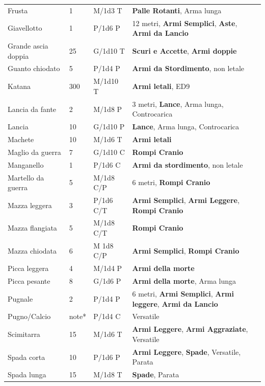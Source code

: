 \begin{xltabular}{1\textwidth}{lllX}
Frusta& 1& M/1d3 T& \textbf{Palle Rotanti}, Arma lunga\\
Giavellotto& 1& P/1d6 P& 12 metri, \textbf{Armi Semplici}, \textbf{Aste}, \textbf{Armi da Lancio}\\
Grande ascia doppia& 25 & G/1d10 T& \textbf{Scuri e Accette}, \textbf{Armi doppie}\\
Guanto chiodato& 5& P/1d4 P&\textbf{Armi da Stordimento}, non letale\\
Katana& 300& M/1d10 T& \textbf{Armi letali}, ED9\\
Lancia da fante& 2& M/1d8 P&3 metri, \textbf{Lance}, Arma lunga, Controcarica\\
Lancia& 10 & G/1d10 P&\textbf{Lance}, Arma lunga, Controcarica\\
Machete& 10 & M/1d6 T&\textbf{Armi letali}\\
Maglio da guerra& 7& G/1d10 C& \textbf{Rompi Cranio}\\
Manganello& 1& P/1d6 C& \textbf{Armi da stordimento}, non letale\\
Martello da guerra& 5& M/1d8 C/P& 6 metri, \textbf{Rompi Cranio}\\
Mazza leggera& 3& P/1d6 C/T& \textbf{Armi Semplici}, \textbf{Armi Leggere}, \textbf{Rompi Cranio} \\
Mazza flangiata& 5& M/1d8 C/T& \textbf{Rompi Cranio}\\
Mazza chiodata& 6& M 1d8 C/P& \textbf{Armi Semplici}, \textbf{Rompi Cranio}\\
Picca leggera& 4& M/1d4 P&\textbf{Armi della morte}\\
Picca pesante& 8& G/1d6 P&\textbf{Armi della morte}, Arma lunga\\
Pugnale& 2& P/1d4 P& 6 metri, \textbf{Armi Semplici}, \textbf{Armi leggere}, \textbf{Armi da Lancio}\\
Pugno/Calcio & note*& P/1d4 C&Versatile\\
Scimitarra& 15 & M/1d6 T&\textbf{Armi Leggere}, \textbf{Armi Aggraziate}, Versatile\\
Spada corta& 10 & P/1d6 P&\textbf{Armi Leggere}, \textbf{Spade}, Versatile, Parata\\
Spada lunga& 15 & M/1d8 T&\textbf{Spade}, Parata\\

\end{xltabular}
